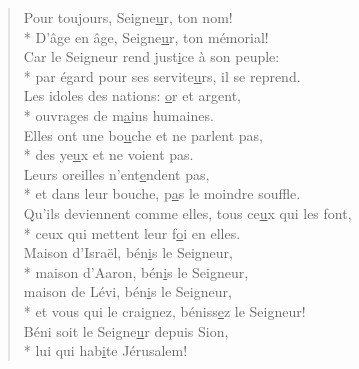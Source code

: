 \begin{verse}
Pour toujours, Seigne\underline{u}r, ton nom! \\*
D’âge en âge, Seigne\underline{u}r, ton mémorial! \\
Car le Seigneur rend just\underline{i}ce à son peuple: \\*
par égard pour ses servite\underline{u}rs, il se reprend. \\

Les idoles des nations: \underline{o}r et argent, \\*
ouvrages de m\underline{a}ins humaines. \\
Elles ont une bo\underline{u}che et ne parlent pas, \\*
des ye\underline{u}x et ne voient pas. \\

Leurs oreilles n’ent\underline{e}ndent pas, \\*
et dans leur bouche, p\underline{a}s le moindre souffle. \\
Qu’ils deviennent comme elles, tous ce\underline{u}x qui les font, \\*
ceux qui mettent leur f\underline{o}i en elles. \\

Maison d’Israël, bén\underline{i}s le Seigneur, \\*
maison d’Aaron, bén\underline{i}s le Seigneur, \\
maison de Lévi, bén\underline{i}s le Seigneur, \\*
et vous qui le craignez, béniss\underline{e}z le Seigneur! \\

Béni soit le Seigne\underline{u}r depuis Sion, \\*
lui qui hab\underline{i}te Jérusalem! \\
\end{verse}

